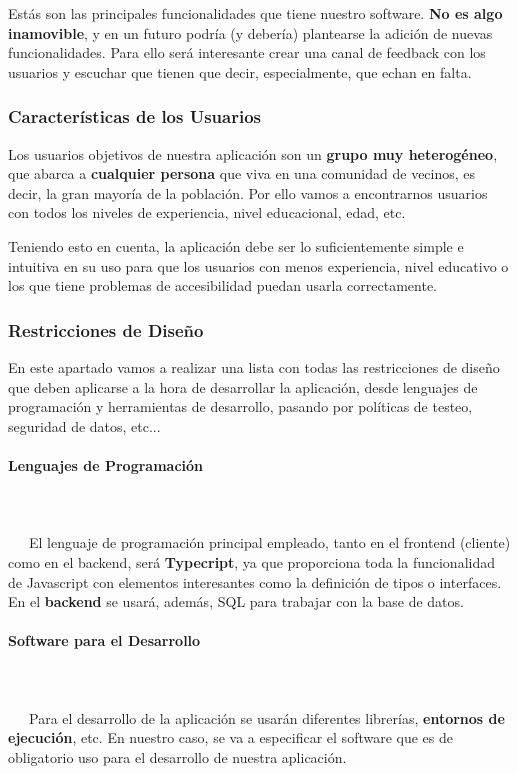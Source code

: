 Estás son las principales funcionalidades que tiene nuestro software. \textbf{No es algo inamovible}, y en un futuro podría (y debería) plantearse la adición de nuevas funcionalidades. Para ello será interesante crear una canal de feedback con los usuarios y escuchar que tienen que decir, especialmente, que echan en falta.

\subsubsection{Características de los Usuarios}
Los usuarios objetivos de nuestra aplicación son un \textbf{grupo muy heterogéneo}, que abarca a \textbf{cualquier persona} que viva en una comunidad de vecinos, es decir, la gran mayoría de la población. Por ello vamos a encontrarnos usuarios con todos los niveles de experiencia, nivel educacional, edad, etc. 

Teniendo esto en cuenta, la aplicación debe ser lo suficientemente simple e intuitiva en su uso para que los usuarios con menos experiencia, nivel educativo o los que tiene problemas de accesibilidad puedan usarla correctamente.

\subsubsection{Restricciones de Diseño}
En este apartado vamos a realizar una lista con todas las restricciones de diseño que deben aplicarse a la hora de desarrollar la aplicación, desde lenguajes de programación y herramientas de desarrollo, pasando por políticas de testeo, seguridad de datos, etc...

\paragraph{Lenguajes de Programación}
~\\\\
\-\ \-\ \-\ El lenguaje de programación principal empleado, tanto en el \gls{frontend} (cliente) como en el \gls{backend}, será \textbf{Typecript}, ya que proporciona toda la funcionalidad de Javascript con elementos interesantes como la definición de tipos o interfaces. En el \textbf{backend} se usará, además, \gls{SQL} para trabajar con la base de datos.

\paragraph{Software para el Desarrollo}
~\\\\
\-\ \-\ \-\ Para el desarrollo de la aplicación se usarán diferentes \gls{librerías}, \textbf{entornos de ejecución}, etc. En nuestro caso, se va a especificar el software que es de obligatorio uso para el desarrollo de nuestra aplicación. 

